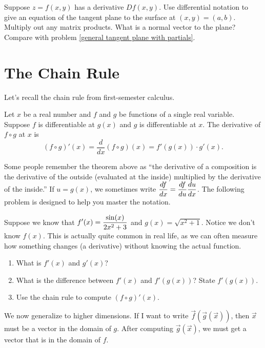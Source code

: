 \begin{problem}
  Suppose $z=f(x,y)$ has a derivative $Df(x,y)$. Use differential notation to give an equation of the tangent plane to the surface at $(x,y)=(a,b)$. Multiply out any matrix products. What is a normal vector to the plane? Compare with problem \ref{general tangent plane with partials}.
\end{problem}

\section{The Chain Rule}

Let's recall the chain rule from first-semester calculus. 

\begin{theorem}
 Let $x$ be a real number and $f$ and $g$ be functions of a single real variable. Suppose $f$ is differentiable at $g(x)$ and $g$ is differentiable at $x$. The derivative of $f\circ g$ at $x$ is 
$$(f\circ g)'(x) = \frac{d}{dx}(f\circ g)(x) = f'(g(x))\cdot g'(x).$$
\end{theorem}

Some people remember the theorem above as ``the derivative of a composition is the derivative of the outside (evaluated at the inside) multiplied by the derivative of the inside.'' If $u=g(x)$, we sometimes write $\displaystyle \frac{df}{dx}=\frac{df}{du}\frac{du}{dx}$. The following problem is designed to help you master the notation.

\begin{problem}\label{chain rule review problem}
 Suppose we know that $\displaystyle f'(x) = \frac{\sin(x)}{2x^2+3}$ and $g(x)=\sqrt{x^2+1}$. Notice we don't know $f(x)$.  This is actually quite common in real life, as we can often measure how something changes (a derivative) without knowing the actual function.
\begin{enumerate}
 \item What is $f'(x)$ and $g'(x)$?
 \item What is the difference between $f'(x)$ and $f'(g(x))$? State $f'(g(x))$.
 \item Use the chain rule to compute $(f\circ g)'(x)$.
\end{enumerate}
\end{problem}

We now generalize to higher dimensions. If I want to write $\vec f(\vec g(\vec x))$, then $\vec x$ must be a vector in the domain of $g$.  After computing $\vec g(\vec x)$, we must get a vector that is in the domain of $f$. 

